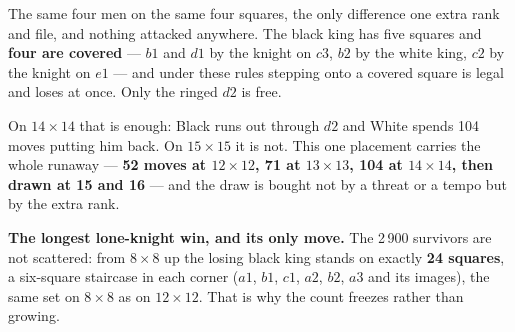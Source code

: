 \documentclass[10pt]{article}
\begin{document}
\medskip
\noindent
\begin{minipage}[t]{0.30\textwidth}
\end{minipage}\hfill
\begin{minipage}[t]{0.30\textwidth}
\end{minipage}\hfill
\begin{minipage}[t]{0.36\textwidth}\vspace{0pt}\small
The same four men on the same four squares, the only difference one extra rank
and file, and nothing attacked anywhere. The black king has five squares and
\textbf{four are covered} --- $b1$ and $d1$ by the knight on $c3$, $b2$ by the
white king, $c2$ by the knight on $e1$ --- and under these rules stepping onto
a covered square is legal and loses at once. Only the ringed $d2$ is free.

\smallskip
On $14\times14$ that is enough: Black runs out through $d2$ and White spends
104 moves putting him back. On $15\times15$ it is not. This one placement
carries the whole runaway --- \textbf{52 moves at $12\times12$, 71 at
$13\times13$, 104 at $14\times14$, then drawn at 15 and 16} --- and the draw is
bought not by a threat or a tempo but by the extra rank.
\end{minipage}

\medskip
\noindent
\textbf{The longest lone-knight win, and its only move.} The 2\,900 survivors
are not scattered: from $8\times8$ up the losing black king stands on exactly
\textbf{24 squares}, a six-square staircase in each corner ($a1$, $b1$, $c1$,
$a2$, $b2$, $a3$ and its images), the same set on $8\times8$ as on
$12\times12$. That is why the count freezes rather than growing.
\end{document}
